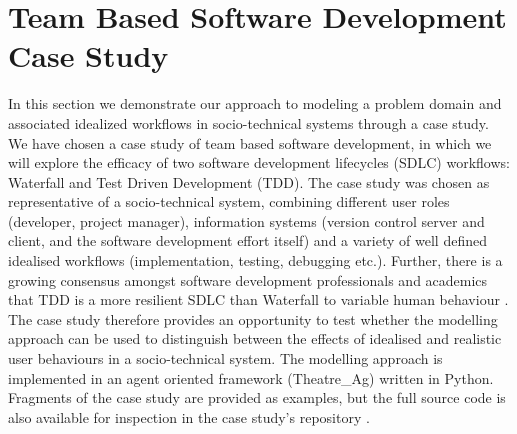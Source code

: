 \documentclass{llncs}
\begin{document}

\section{Team Based Software Development Case Study}
\label{sec:case-study}


In this section we demonstrate our approach to modeling a problem domain and associated idealized workflows in
socio-technical systems through a case study.  We have chosen a case study of team based software development, in which
we will explore the efficacy of two software development lifecycles (SDLC) workflows: Waterfall and Test Driven
Development (TDD).  The case study was chosen as representative of a socio-technical system, combining different user
roles (developer, project manager), information systems (version control server and client, and the software development
effort itself) and a variety of well defined idealised workflows (implementation, testing, debugging etc.).  Further,
there is a growing consensus amongst software development professionals and academics that TDD is a more resilient SDLC
than Waterfall to variable human behaviour
\citep{Bhat2006TestDrivenDevelopment,George2004TestDrivenDevelopment,Huang2009EmpiricalTestFirstProgramming}.  The case
study therefore provides an opportunity to test whether the modelling approach can be used to distinguish between the
effects of idealised and realistic user behaviours in a socio-technical system.  The modelling approach is implemented
in an agent oriented framework (Theatre\_Ag) written in Python.  Fragments of the case study are provided as examples,
but the full source code is also available for inspection in the case study's repository 
\cite{storer2016softdev-workflow-scm}.
\end{document}
